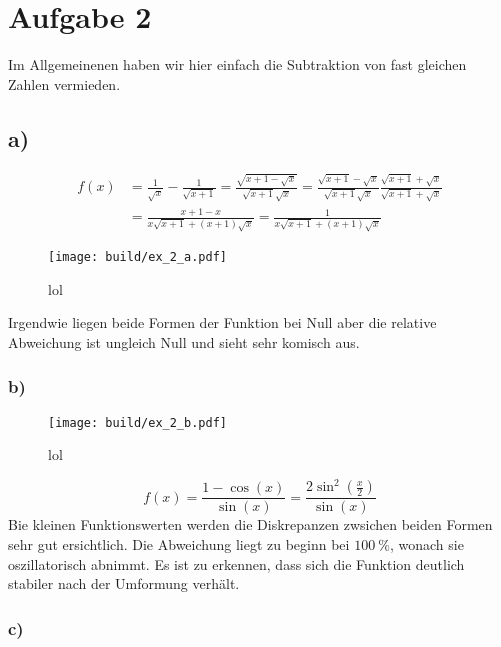 \section*{Aufgabe 2}
Im Allgemeinenen haben wir hier einfach die Subtraktion von fast gleichen Zahlen vermieden.
\subsection*{a)}
\begin{align*}
    f(x) &= \frac{1}{\sqrt{x}} - \frac{1}{\sqrt{x+1}}
    = \frac{\sqrt{x+1 - \sqrt{x}}}{\sqrt{x+1}\sqrt{x}}
    = \frac{\sqrt{x+1} - \sqrt{x}}{\sqrt{x+1}\sqrt{x}} \frac{\sqrt{x+1} + \sqrt{x}}{\sqrt{x+1} + \sqrt{x}} \\
    &= \frac{x+1-x}{x \sqrt{x+1} + (x+1)\sqrt{x}}  =
    \frac{1}{x \sqrt{x+1} + (x+1)\sqrt{x}}
\end{align*}
\begin{figure}
    \centering
    \texttt{[image: build/ex\_2\_a.pdf]}
    \caption{lol}
    \label{fig:a}
\end{figure}
Irgendwie liegen beide Formen der Funktion bei Null aber die relative Abweichung ist ungleich Null und sieht sehr komisch aus.
\FloatBarrier
\subsubsection*{b)}
\begin{figure}
    \centering
    \texttt{[image: build/ex\_2\_b.pdf]}
    \caption{lol}
    \label{fig:b}
\end{figure}
\begin{equation*}
    f(x) = \frac{1- \cos (x)}{\sin (x)} = \frac{2\sin^2(\frac{x}{2})}{\sin(x)}
\end{equation*}
Bie kleinen Funktionswerten werden die Diskrepanzen zwsichen beiden Formen sehr gut ersichtlich.
Die Abweichung liegt zu beginn bei $\qty{100}{\percent}$, wonach sie oszillatorisch abnimmt.
Es ist zu erkennen, dass sich die Funktion deutlich stabiler nach der Umformung verhält.
\FloatBarrier
\subsubsection*{c)}

